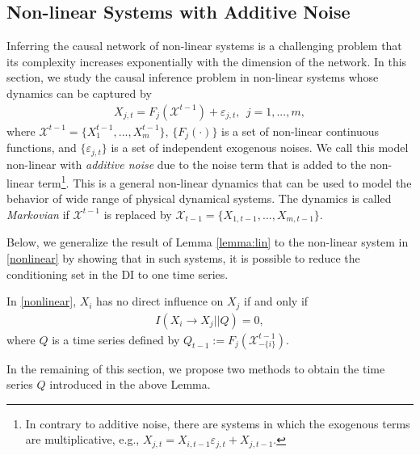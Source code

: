 \subsection{Non-linear Systems with Additive Noise}
Inferring the causal network of non-linear systems is a challenging problem that its complexity increases exponentially with the dimension of the network. 
In this section, we study the causal inference problem in non-linear systems whose dynamics can be captured by
\begin{align}\label{nonlinear}
    X_{j,t} = F_{j}(\mathcal{X}^{t-1}) + \varepsilon_{j,t}, \ \ j=1,...,m,
\end{align}
where $\mathcal{X}^{t-1}=\{X_{1}^{t-1},...,X_{m}^{t-1}\}$, $\{F_j(\cdot)\}$ is a set of non-linear continuous functions, and $\{\varepsilon_{j,t}\}$ is a set of independent exogenous noises.
We call this model non-linear with \textit{additive noise} due to the noise term that is added to the non-linear term\footnote{In contrary to additive noise, there are systems in which the exogenous terms are multiplicative, e.g., $X_{j,t}=X_{i,t-1}\varepsilon_{j,t}+X_{j,t-1}$.}.
This is a general non-linear dynamics that can be used to model the behavior of wide range of physical dynamical systems.
The dynamics is called \textit{Markovian} if $\mathcal{X}^{t-1}$ is replaced by $\mathcal{X}_{t-1}=\{X_{1,t-1},...,X_{m,t-1}\}$.

Below, we generalize the result of Lemma \ref{lemma:lin} to the non-linear system in \eqref{nonlinear} by showing that in such systems, it is possible to reduce the conditioning set in the DI to one time series. 
\clearpage
\begin{lemma}\label{lemma:nonlinear}
In \eqref{nonlinear}, $X_i$ has no direct influence on $X_j$ if and only if 
\begin{align}\label{eq:non-q}
I(X_{i}\rightarrow X_j || Q) =0,
\end{align}
where $Q$ is a time series defined by $Q_{t-1}:=F_{j}(\mathcal{X}^{t-1}_{-\{i\}})$. 
\end{lemma}
In the remaining of this section, we propose two methods to obtain the time series $Q$ introduced in the above Lemma. 

